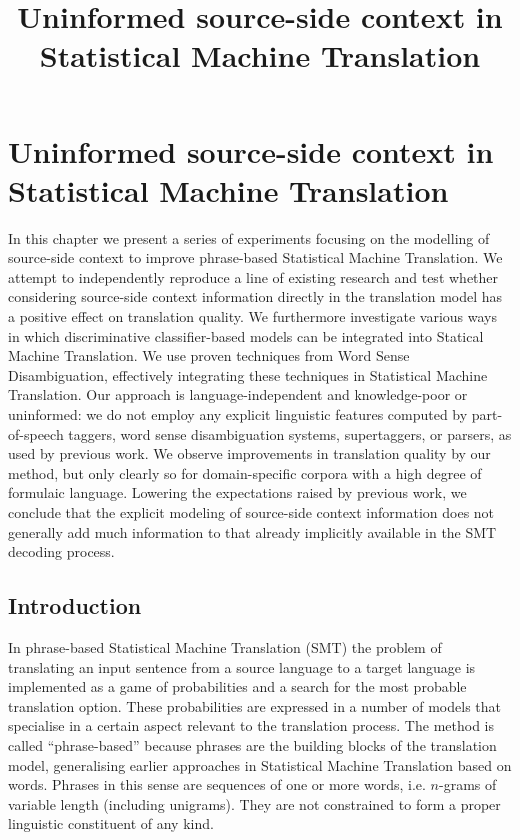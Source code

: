


\chapter{Uninformed source-side context in Statistical Machine Translation}
\title{Uninformed source-side context in Statistical Machine Translation}
\label{chap:contextinsmt}
\label{chap:sourcecontextinsmt}




In this chapter we present a series of experiments focusing on the modelling of
source-side context to improve phrase-based Statistical Machine Translation. We
attempt to independently reproduce a line of existing research and test whether
considering source-side context information directly in the translation model
has a positive effect on translation quality.  We furthermore investigate
various ways in which discriminative classifier-based models can be integrated
into Statical Machine Translation.  We use proven techniques from Word Sense
Disambiguation, effectively integrating these techniques in Statistical Machine
Translation. Our approach is language-independent and knowledge-poor or
uninformed: we do not employ any explicit linguistic features computed by
part-of-speech taggers, word sense disambiguation systems, supertaggers, or
parsers, as used by previous work. We observe improvements in translation
quality by our method, but only clearly so for domain-specific corpora with a
high degree of formulaic language. Lowering the expectations raised by previous
work, we conclude that the explicit modeling of source-side context information
does not generally add much information to that already implicitly available in
the SMT decoding process.


\section{Introduction}

In phrase-based Statistical Machine Translation (SMT) the problem of
translating an input sentence from a source language to a target language is
implemented as a game of probabilities and a search for the most probable
translation option.  These probabilities are expressed in a number of models
that specialise in a certain aspect relevant to the translation process. The
method is called ``phrase-based'' because phrases are the building blocks of
the translation model, generalising earlier approaches in
Statistical Machine Translation based on words.  Phrases in this
sense are sequences of one or more words, i.e. $n$-grams of variable
length (including unigrams). They are not constrained to form a
proper linguistic constituent of any kind.

